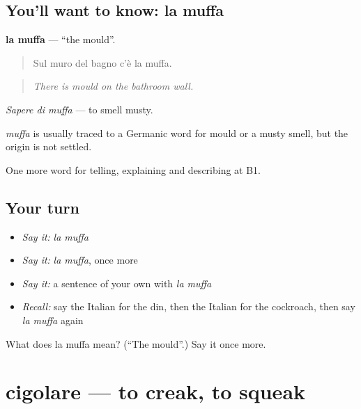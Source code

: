 \subsection*{You'll want to know: la muffa}
\textbf{la muffa} — \textquotedblleft{}the mould\textquotedblright{}.

\begin{quote}
Sul muro del bagno c'è la muffa.
\end{quote}

\begin{quote}
\emph{There is mould on the bathroom wall.}
\end{quote}

\emph{Sapere di muffa} — to smell musty.

\begin{cousinweb}
\emph{muffa} is usually traced to a Germanic word for mould or a musty smell, but the origin is not settled.
\end{cousinweb}

\begin{grammarlens}[title={What you've built}]
One more word for telling, explaining and describing at B1.
\end{grammarlens}

\subsection*{Your turn}
\begin{itemize}
\raggedright
  \item \emph{Say it:} \emph{la muffa}
  \item \emph{Say it:} \emph{la muffa}, once more
  \item \emph{Say it:} a sentence of your own with \emph{la muffa}
  \item \emph{Recall:} say the Italian for the din, then the Italian for the cockroach, then say \emph{la muffa} again
\end{itemize}

\begin{tcolorbox}[breakable,colback=teal!4,colframe=teal!35!black,title={Before you move on}]
What does la muffa mean? (\textquotedblleft{}The mould\textquotedblright{}.) Say it once more.
\end{tcolorbox}
\section[cigolare]{cigolare — to creak, to squeak}

\label{lesson:IT-C437-cigolare}



